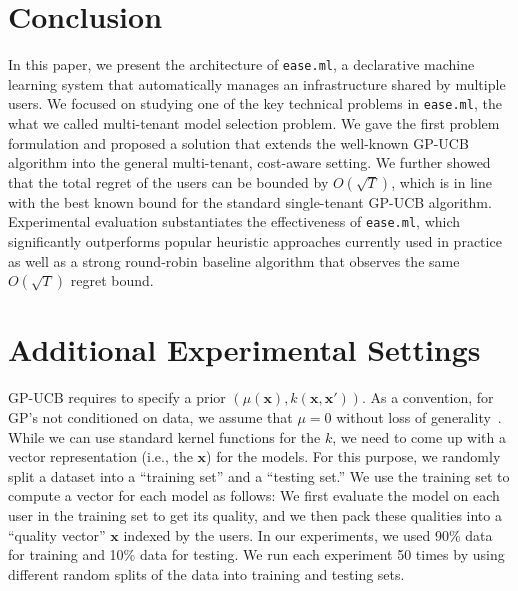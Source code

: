 \documentclass[letterpaper]{vldb}
\newcommand{\eml}{\texttt{ease.ml}\xspace}
\begin{document}
\section{Conclusion}\label{sec:conclusion}

In this paper, we present the architecture of \eml, a declarative machine learning system that automatically manages an infrastructure shared by multiple users.
We focused on studying one of the key technical problems in \eml, the what we called multi-tenant model selection problem.
We gave the first problem formulation and proposed a solution that extends the well-known GP-UCB algorithm into the general multi-tenant, cost-aware setting.
We further showed that the total regret of the users can be bounded by $O(\sqrt{T})$, which is in line with the best known bound for the standard single-tenant GP-UCB algorithm.
Experimental evaluation substantiates the effectiveness of \eml, which significantly outperforms popular heuristic approaches currently used in practice as well as a strong round-robin baseline algorithm that observes the same $O(\sqrt{T})$ regret bound.


\newpage


  



\appendix


\section{Additional Experimental Settings}

GP-UCB requires to specify a prior $(\mu(\mathbf{x}), k(\mathbf{x},\mathbf{x}'))$.
As a convention, for GP's not conditioned on data, we assume that $\mu=0$ without loss of generality~\cite{SrinivasKKS10}.
While we can use standard kernel functions for the $k$, we need to come up with a vector representation (i.e., the $\mathbf{x}$) for the models.
For this purpose, we randomly split a dataset into a ``training set'' and a ``testing set.''
We use the training set to compute a vector for each model as follows:
We first evaluate the model on each user in the training set to get its quality, and we then pack these qualities into a ``quality vector'' $\mathbf{x}$ indexed by the users.
In our experiments, we used 90\% data for training and 10\% data for testing.
We run each experiment 50 times by using different random splits of the data into training and testing sets.
\end{document}
